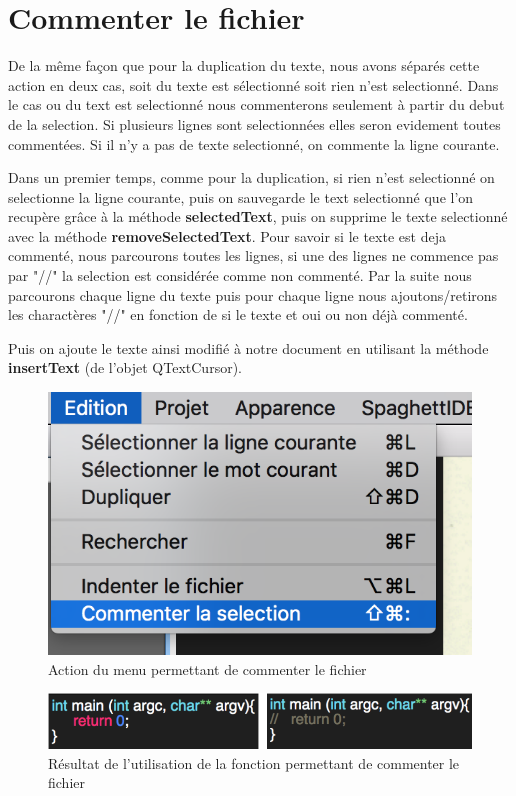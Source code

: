 \documentclass[a4paper,12pt]{article}
\begin{document}
\section{Commenter le fichier}

	De la même façon que pour la duplication du texte, nous avons séparés cette action en deux cas, soit du texte est sélectionné soit rien n'est selectionné.
	Dans le cas ou du text est selectionné nous commenterons seulement à partir du debut de la selection. Si plusieurs lignes sont selectionnées elles seron evidement toutes commentées. Si il n'y a pas de texte selectionné, on commente la ligne courante.

	Dans un premier temps, comme pour la duplication, si rien n'est selectionné on selectionne la ligne courante, puis on sauvegarde le text selectionné que l'on recupère grâce à la méthode \textbf{selectedText}, puis on supprime le texte selectionné avec la méthode \textbf{removeSelectedText}. Pour savoir si le texte est deja commenté, nous parcourons toutes les lignes, si une des lignes ne commence pas par "//" la selection est considérée comme non commenté. Par la suite nous parcourons chaque ligne du texte puis pour chaque ligne nous ajoutons/retirons les charactères "//" en fonction de si le texte et oui ou non déjà commenté.

	Puis on ajoute le texte ainsi modifié à notre document en utilisant la méthode \textbf{insertText} (de l'objet QTextCursor).

	\newpage{}

	\begin{figure}[h!]

		\begin{center}
			\includegraphics[scale=0.8]{imgs/utilisation_commentaire}
			\caption{Action du menu permettant de commenter le fichier}
		\end{center}
	\end{figure}

	\begin{figure}[h!]
		\begin{center}
			\includegraphics[scale=0.8]{imgs/resultat_commentaire}
			\caption{Résultat de l'utilisation de la fonction permettant de commenter le fichier}
		\end{center}
	\end{figure}

	
\end{document}
